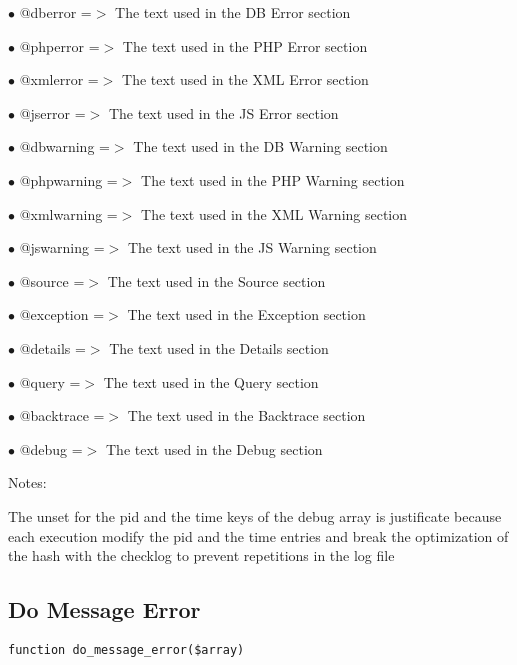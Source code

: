 \documentclass[a4paper]{book}
\begin{document}
\begin{compactitem}
\item[\color{myblue}$\bullet$] @dberror    =$>$ The text used in the DB Error section
\item[\color{myblue}$\bullet$] @phperror   =$>$ The text used in the PHP Error section
\item[\color{myblue}$\bullet$] @xmlerror   =$>$ The text used in the XML Error section
\item[\color{myblue}$\bullet$] @jserror    =$>$ The text used in the JS Error section
\item[\color{myblue}$\bullet$] @dbwarning  =$>$ The text used in the DB Warning section
\item[\color{myblue}$\bullet$] @phpwarning =$>$ The text used in the PHP Warning section
\item[\color{myblue}$\bullet$] @xmlwarning =$>$ The text used in the XML Warning section
\item[\color{myblue}$\bullet$] @jswarning  =$>$ The text used in the JS Warning section
\item[\color{myblue}$\bullet$] @source     =$>$ The text used in the Source section
\item[\color{myblue}$\bullet$] @exception  =$>$ The text used in the Exception section
\item[\color{myblue}$\bullet$] @details    =$>$ The text used in the Details section
\item[\color{myblue}$\bullet$] @query      =$>$ The text used in the Query section
\item[\color{myblue}$\bullet$] @backtrace  =$>$ The text used in the Backtrace section
\item[\color{myblue}$\bullet$] @debug      =$>$ The text used in the Debug section
\end{compactitem}

Notes:

The unset for the pid and the time keys of the debug array is justificate
because each execution modify the pid and the time entries and break the
optimization of the hash with the checklog to prevent repetitions in the
log file

\hypertarget{toc101}{}
\subsection{Do Message Error}

\begin{lstlisting}
function do_message_error($array)
\end{lstlisting}
\end{document}
